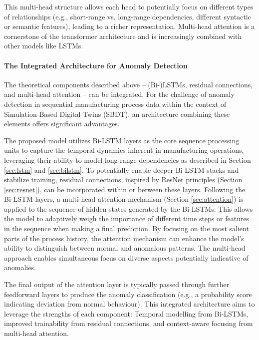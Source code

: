 This multi-head structure allows each head to potentially focus on different types of relationships (e.g., short-range vs. long-range dependencies, different syntactic or semantic features), leading to a richer representation. Multi-head attention is a cornerstone of the transformer architecture \autocite{vaswani2017attention} and is increasingly combined with other models like LSTMs.

\paragraph{\textbf{The Integrated Architecture for Anomaly Detection}}
\label{sec:integrated_architecture}

The theoretical components described above -- (Bi-)LSTMs, residual connections, and multi-head attention -- can be integrated. For the challenge of anomaly detection in sequential manufacturing process data within the context of Simulation-Based Digital Twins (SBDT), an architecture combining these elements offers significant advantages.

The proposed model utilizes Bi-LSTM layers as the core sequence processing units to capture the temporal dynamics inherent in manufacturing operations, leveraging their ability to model long-range dependencies as described in Section \autoref{sec:lstm} and \autoref{sec:bilstm}. To potentially enable deeper Bi-LSTM stacks and stabilize training, residual connections, inspired by ResNet principles (Section \autoref{sec:resnet}), can be incorporated within or between these layers.
Following the Bi-LSTM layers, a multi-head attention mechanism (Section \autoref{sec:attention}) is applied to the sequence of hidden states generated by the Bi-LSTMs. This allows the model to adaptively weigh the importance of different time steps or features in the sequence when making a final prediction. By focusing on the most salient parts of the process history, the attention mechanism can enhance the model's ability to distinguish between normal and anomalous patterns. The multi-head approach enables simultaneous focus on diverse aspects potentially indicative of anomalies.

The final output of the attention layer is typically passed through further feedforward layers to produce the anomaly classification (e.g., a probability score indicating deviation from normal behaviour). This integrated architecture aims to leverage the strengths of each component: Temporal modelling from Bi-LSTMs, improved trainability from residual connections, and context-aware focusing from multi-head attention.

